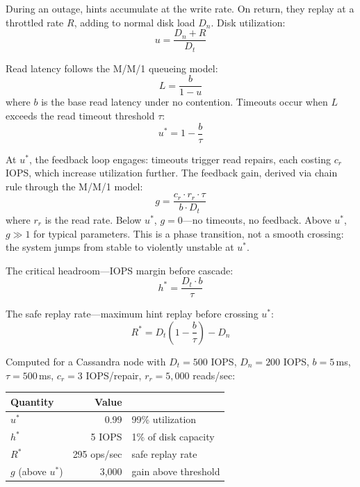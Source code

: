 \documentclass[11pt]{article}
\begin{document}
During an outage, hints accumulate at the write rate. On return, they replay at a
throttled rate $R$, adding to normal disk load $D_n$. Disk utilization:
\begin{equation}
  u = \frac{D_n + R}{D_t}
\end{equation}

Read latency follows the M/M/1 queueing model:
\begin{equation}
  L = \frac{b}{1 - u}
\end{equation}
where $b$ is the base read latency under no contention. Timeouts occur when $L$
exceeds the read timeout threshold $\tau$:
\begin{equation}
  u^* = 1 - \frac{b}{\tau}
\end{equation}

At $u^*$, the feedback loop engages: timeouts trigger read repairs, each costing
$c_r$ IOPS, which increase utilization further. The feedback gain, derived via
chain rule through the M/M/1 model:
\begin{equation}
  g = \frac{c_r \cdot r_r \cdot \tau}{b \cdot D_t}
\end{equation}
where $r_r$ is the read rate. Below $u^*$, $g = 0$---no timeouts, no feedback.
Above $u^*$, $g \gg 1$ for typical parameters. This is a phase transition, not a
smooth crossing: the system jumps from stable to violently unstable at $u^*$.

The critical headroom---IOPS margin before cascade:
\begin{equation}
  h^* = \frac{D_t \cdot b}{\tau}
\end{equation}

The safe replay rate---maximum hint replay before crossing $u^*$:
\begin{equation}
  R^* = D_t \left(1 - \frac{b}{\tau}\right) - D_n
\end{equation}

Computed for a Cassandra node with $D_t = 500$ IOPS, $D_n = 200$ IOPS,
$b = 5$\,ms, $\tau = 500$\,ms, $c_r = 3$ IOPS/repair, $r_r = 5{,}000$
reads/sec:

\begin{center}
\begin{tabular}{@{}lrl@{}}
\toprule
Quantity & Value & \\
\midrule
$u^*$ & 0.99 & 99\% utilization \\
$h^*$ & 5 IOPS & 1\% of disk capacity \\
$R^*$ & 295 ops/sec & safe replay rate \\
$g$ (above $u^*$) & 3{,}000 & gain above threshold \\
\bottomrule
\end{tabular}
\end{center}
\end{document}
